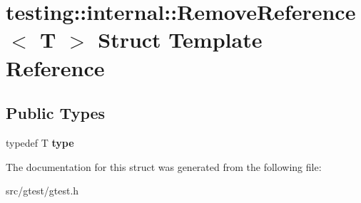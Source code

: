 \hypertarget{structtesting_1_1internal_1_1_remove_reference}{}\section{testing\+:\+:internal\+:\+:Remove\+Reference$<$ T $>$ Struct Template Reference}
\label{structtesting_1_1internal_1_1_remove_reference}
\subsection*{Public Types}
\begin{DoxyCompactItemize}
\item 
\mbox{\label{structtesting_1_1internal_1_1_remove_reference_a9ca4f6499579225f7986b789ee4b2895}} 
typedef T {\bfseries type}
\end{DoxyCompactItemize}


The documentation for this struct was generated from the following file\+:\begin{DoxyCompactItemize}
\item 
src/gtest/gtest.\+h\end{DoxyCompactItemize}
